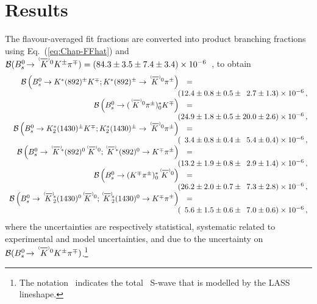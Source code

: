 \section{Results}
\label{sec:results}

The flavour-averaged fit fractions are converted into product branching fractions using Eq.~(\ref{eq:Chap-FFhat}) and 
${\cal B}(\BsToKzBarOptKpi) = (84.3 \pm 3.5 \pm 7.4 \pm 3.4)\times10^{-6}$~\cite{LHCb-PAPER-2017-010}, to obtain
\begin{equation*}
\begin{array}{rcl}      
\Br{\Bs \to \KstarIpm\Kmp; \KstarIpm \to \KorKbarz\pipm}               &=& \\
& \multicolumn{2}{l}{\hspace{-4mm}(   12.4 \pm   0.8   \pm   0.5   \pm   \phz2.7   \pm   1.3)  \times 10^{-6} \,,} \\  
\Br{\Bs \to \KpiSpm\Kmp}                                               &=& \\
& \multicolumn{2}{l}{\hspace{-4mm}(   24.9 \pm   1.8   \pm   0.5   \pm      20.0   \pm   2.6)  \times 10^{-6} \,,} \\
\Br{\Bs \to \KstarIIIpm\Kmp; \KstarIIIpm \to \KorKbarz\pipm}           &=& \\
& \multicolumn{2}{l}{\hspace{-4mm}(\phz3.4 \pm   0.8   \pm   0.4   \pm   \phz5.4   \pm   0.4)  \times 10^{-6} \,,} \\
\Br{\Bs \to \KstarIzoptbar\KorKbarz; \KstarIzoptbar \to \Kmp\pipm}     &=& \\
& \multicolumn{2}{l}{\hspace{-4mm}(   13.2 \pm   1.9   \pm   0.8   \pm   \phz2.9   \pm   1.4)  \times 10^{-6} \,,} \\
\Br{\Bs \to \KpiSz\KorKbarz}                                           &=& \\
& \multicolumn{2}{l}{\hspace{-4mm}(   26.2 \pm   2.0   \pm   0.7   \pm   \phz7.3   \pm   2.8)  \times 10^{-6} \,,} \\
\Br{\Bs \to \KstarIIIzoptbar\KorKbarz; \KstarIIIzoptbar \to \Kmp\pipm} &=& \\
& \multicolumn{2}{l}{\hspace{-4mm}(\phz5.6 \pm   1.5   \pm   0.6   \pm   \phz7.0   \pm   0.6)  \times 10^{-6} \,,}
\end{array}  
\end{equation*}
where the uncertainties are respectively statistical, systematic related to experimental and model uncertainties, and due to
the uncertainty on ${\cal{B}}(\BsToKzBarOptKpi)$.\footnote{The notation \KpiS\ indicates the total \kpi\ S-wave that is modelled by the LASS lineshape.}

